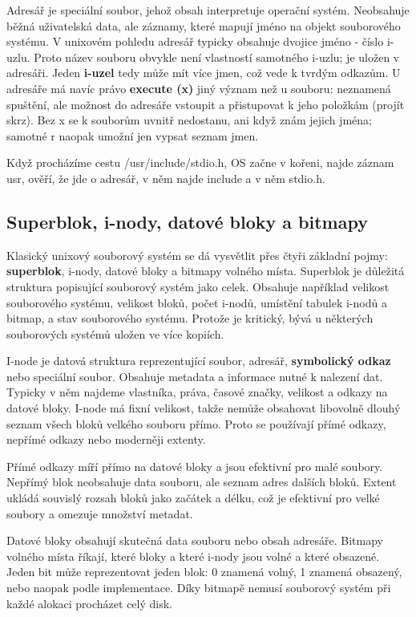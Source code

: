 \documentclass[11pt,a4paper]{article}
\begin{document}
Adresář je speciální soubor, jehož obsah interpretuje operační systém. Neobsahuje běžná uživatelská data, ale záznamy, které mapují jméno na objekt souborového systému. V unixovém pohledu adresář typicky obsahuje dvojice jméno - číslo i-uzlu. Proto název souboru obvykle není vlastností samotného i-uzlu; je uložen v adresáři. Jeden \textbf{i-uzel} tedy může mít více jmen, což vede k tvrdým odkazům. U adresáře má navíc právo \textbf{execute (x)} jiný význam než u souboru: neznamená spuštění, ale možnost do adresáře vstoupit a přistupovat k jeho položkám (projít skrz). Bez x se k souborům uvnitř nedostanu, ani když znám jejich jména; samotné r naopak umožní jen vypsat seznam jmen.

Když procházíme cestu /usr/include/stdio.h, OS začne v kořeni, najde záznam usr, ověří, že jde o adresář, v něm najde include a v něm stdio.h.

\subsection*{Superblok, i-nody, datové bloky a bitmapy}

Klasický unixový souborový systém se dá vysvětlit přes čtyři základní pojmy: \textbf{superblok}, i-nody, datové bloky a bitmapy volného místa. Superblok je důležitá struktura popisující souborový systém jako celek. Obsahuje například velikost souborového systému, velikost bloků, počet i-nodů, umístění tabulek i-nodů a bitmap, a stav souborového systému. Protože je kritický, bývá u některých souborových systémů uložen ve více kopiích.

I-node je datová struktura reprezentující soubor, adresář, \textbf{symbolický odkaz} nebo speciální soubor. Obsahuje metadata a informace nutné k nalezení dat. Typicky v něm najdeme vlastníka, práva, časové značky, velikost a odkazy na datové bloky. I-node má fixní velikost, takže nemůže obsahovat libovolně dlouhý seznam všech bloků velkého souboru přímo. Proto se používají přímé odkazy, nepřímé odkazy nebo moderněji extenty.

Přímé odkazy míří přímo na datové bloky a jsou efektivní pro malé soubory. Nepřímý blok neobsahuje data souboru, ale seznam adres dalších bloků. Extent ukládá souvislý rozsah bloků jako začátek a délku, což je efektivní pro velké soubory a omezuje množství metadat.

Datové bloky obsahují skutečná data souboru nebo obsah adresáře. Bitmapy volného místa říkají, které bloky a které i-nody jsou volné a které obsazené. Jeden bit může reprezentovat jeden blok: 0 znamená volný, 1 znamená obsazený, nebo naopak podle implementace. Díky bitmapě nemusí souborový systém při každé alokaci procházet celý disk.
\end{document}
